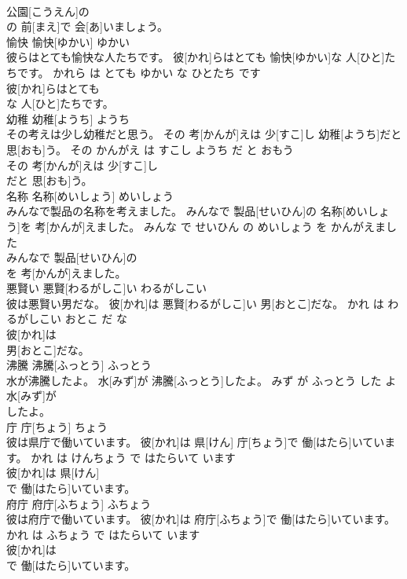 \documentclass[8pt]{extreport}
\begin{document}
\begin{CJK}{UTF8}{min}
\\	公園[こうえん]の
\\	の 前[まえ]で 会[あ]いましょう。			
\\	愉快	愉快[ゆかい]	ゆかい	
\\	彼らはとても愉快な人たちです。	彼[かれ]らはとても 愉快[ゆかい]な 人[ひと]たちです。	かれら は とても ゆかい な ひとたち です	
\\	彼[かれ]らはとても
\\	な 人[ひと]たちです。			
\\	幼稚	幼稚[ようち]	ようち	
\\	その考えは少し幼稚だと思う。	その 考[かんが]えは 少[すこ]し 幼稚[ようち]だと 思[おも]う。	その かんがえ は すこし ようち だ と おもう	
\\	その 考[かんが]えは 少[すこ]し
\\	だと 思[おも]う。			
\\	名称	名称[めいしょう]	めいしょう	
\\	みんなで製品の名称を考えました。	みんなで 製品[せいひん]の 名称[めいしょう]を 考[かんが]えました。	みんな で せいひん の めいしょう を かんがえました	
\\	みんなで 製品[せいひん]の
\\	を 考[かんが]えました。			
\\	悪賢い	悪賢[わるがしこ]い	わるがしこい	
\\	彼は悪賢い男だな。	彼[かれ]は 悪賢[わるがしこ]い 男[おとこ]だな。	かれ は わるがしこい おとこ だ な	
\\	彼[かれ]は
\\	男[おとこ]だな。			
\\	沸騰	沸騰[ふっとう]	ふっとう	
\\	水が沸騰したよ。	水[みず]が 沸騰[ふっとう]したよ。	みず が ふっとう した よ	
\\	水[みず]が
\\	したよ。			
\\	庁	庁[ちょう]	ちょう	
\\	彼は県庁で働いています。	彼[かれ]は 県[けん] 庁[ちょう]で 働[はたら]いています。	かれ は けんちょう で はたらいて います	
\\	彼[かれ]は 県[けん]
\\	で 働[はたら]いています。			
\\	府庁	府庁[ふちょう]	ふちょう	
\\	彼は府庁で働いています。	彼[かれ]は 府庁[ふちょう]で 働[はたら]いています。	かれ は ふちょう で はたらいて います	
\\	彼[かれ]は
\\	で 働[はたら]いています。			

\end{CJK}
\end{document}
